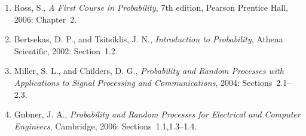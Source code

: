 \begin{small}
\begin{enumerate}
\item Ross, S., \emph{A First Course in Probability}, 7th edition, Pearson Prentice Hall, 2006: Chapter~2.
\item Bertsekas, D. P., and Tsitsiklis, J. N., \emph{Introduction to Probability}, Athena Scientific, 2002: Section~1.2.
\item Miller, S. L., and Childers, D. G., \emph{Probability and Random Processes with Applications to Signal Processing and Communications}, 2004: Sections~2.1--2.3.
\item Gubner, J. A., \emph{Probability and Random Processes for Electrical and Computer Engineers}, Cambridge, 2006: Sections~1.1,1.3--1.4.
\end{enumerate}
\end{small}

